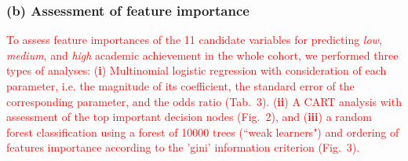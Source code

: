 \documentclass[10pt,letterpaper]{article}
\begin{document}
 \subsubsection*{(b) Assessment of feature importance} 
  \textcolor{red}{To assess feature importances of the 11 candidate variables for predicting {\it low}, {\it medium}, and {\it high} academic achievement in the whole cohort,
 we performed three types of analyses: ({\bf i}) Multinomial logistic regression with consideration of each parameter, i.e. the magnitude of its coefficient, the standard error of the corresponding parameter, and the odds ratio (Tab.~3). 
 ({\bf ii}) A CART analysis with assessment 
 of the top important decision nodes (Fig.~2), and ({\bf iii}) a random forest classification using a forest of 10000 trees (``weak learners") and ordering of features importance according
  to the 'gini' information criterion (Fig.~3). }
 


\end{document}
